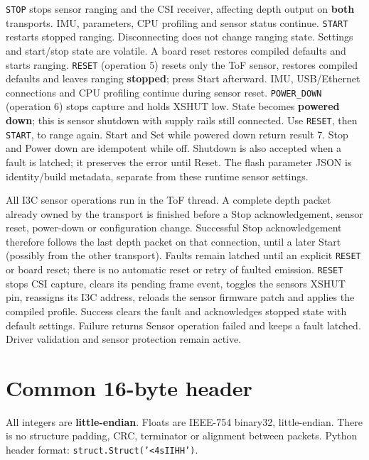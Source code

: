 \documentclass[10pt,a4paper,oneside]{report}
\begin{document}
\texttt{STOP} stops sensor ranging and the CSI receiver, affecting depth output on \textbf{both} transports. IMU, parameters, CPU profiling and sensor status continue. \texttt{START} restarts stopped ranging. Disconnecting does not change ranging state. Settings and start/stop state are volatile. A board reset restores compiled defaults and starts ranging. \texttt{RESET} (operation 5) resets only the ToF sensor, restores compiled defaults and leaves ranging \textbf{stopped}; press Start afterward. IMU, USB/Ethernet connections and CPU profiling continue during sensor reset. \texttt{POWER\_\allowbreak{}DOWN} (operation 6) stops capture and holds XSHUT low. State becomes \textbf{powered down}; this is sensor shutdown with supply rails still connected. Use \texttt{RESET}, then \texttt{START}, to range again. Start and Set while powered down return result 7. Stop and Power down are idempotent while off. Shutdown is also accepted when a fault is latched; it preserves the error until Reset. The flash parameter JSON is identity/build metadata, separate from these runtime sensor settings.

All I3C sensor operations run in the ToF thread. A complete depth packet already owned by the transport is finished before a Stop acknowledgement, sensor reset, power-down or configuration change. Successful Stop acknowledgement therefore follows the last depth packet on that connection, until a later Start (possibly from the other transport). Faults remain latched until an explicit \texttt{RESET} or board reset; there is no automatic reset or retry of faulted emission. \texttt{RESET} stops CSI capture, clears its pending frame event, toggles the sensor\textquotesingle s XSHUT pin, reassigns its I3C address, reloads the sensor firmware patch and applies the compiled profile. Success clears the fault and acknowledges stopped state with default settings. Failure returns Sensor operation failed and keeps a fault latched. Driver validation and sensor protection remain active.

\section{Common 16-byte header}\label{wiki-protocols-wire-protocol--common-16-byte-header}

All integers are \textbf{little-endian}. Floats are IEEE-754 binary32, little-endian. There is no structure padding, CRC, terminator or alignment between packets. Python header format: \texttt{struct.\allowbreak{}Struct('<4sIIHH')}.
\end{document}
